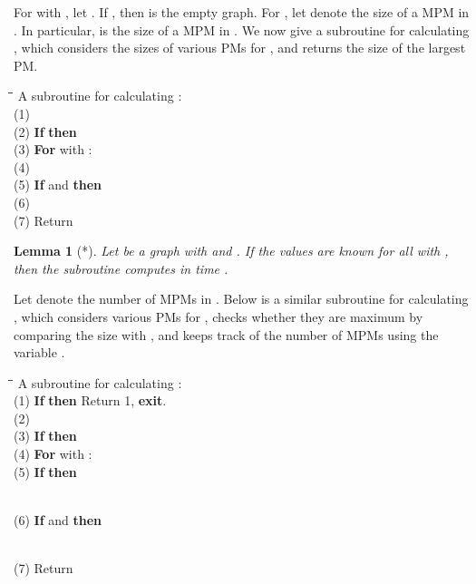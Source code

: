 \documentclass{llncs}
\def\notat#1{{}\marginpar{\raggedright{\small }}}
\newtheorem{lem}[thm]{Lemma}
\begin{document}
For  with , let \notat{G_{i,j}}.
If , then  is the empty graph.
For , let \notat{S_{i,j}} denote the size of a MPM in . In particular,  is the size of a MPM in .
We now give a subroutine  for calculating , which considers the sizes of various PMs for , and returns the size of the largest PM. 

\begin{tabbing}
\qquad \=\quad \=\quad \= \quad \kill
A subroutine  for calculating :\\


(1) \> \\

(2) \> {\bf If}  {\bf then} \\

(3) \> {\bf For}  with :\\

(4) \> \> \\

(5) \> {\bf If}  and  {\bf then}\\

(6) \> \> \\

(7) \> Return 

\end{tabbing}


\begin{lem}[*]
\label{lem:Sroutine}
Let  be a graph with  and .
If the values  are known for all  with , then the subroutine  computes  in time .
\end{lem}



Let \notat{N_{i,j}} denote the number of MPMs in . 
Below is a similar subroutine  for calculating , which considers various PMs for , checks whether they are maximum by comparing the size with , and keeps track of the number of MPMs using the variable .


\begin{tabbing}
\qquad \=\quad \=\quad \= \quad \kill
A subroutine  for calculating :\\

(1) \> {\bf If}  {\bf then} Return 1, {\bf exit}.\\

(2) \> \\

(3) \> {\bf If}  {\bf then} \\

(4) \> {\bf For}  with :\\

(5) \> \> {\bf If}  {\bf then}

		\\

(6) \> {\bf If}  and  {\bf then}

 \\

(7) \> Return 

\end{tabbing}
\end{document}
